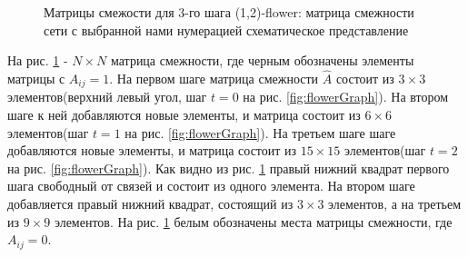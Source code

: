 \documentclass[10pt,aps,pra]{revtex4-1}
\begin{document}
\begin{figure}[H]  

\centering
{}  

\caption{
\label{fig:flowerMatrix}
Матрицы смежости для 3-го шага (1,2)-flower:
  матрица смежности сети с выбранной нами нумерацией
 схематическое представление
}
\end{figure}

На рис. \ref{fig:flowerMatrix} - $N \times N$ матрица смежности, где черным обозначены элементы матрицы с $A_{ij}=1$. На первом шаге матрица смежности $\hat{A}$ состоит из $3 \times 3$ элементов(верхний левый угол, шаг $t=0$ на рис. \ref{fig:flowerGraph}). На втором шаге к ней добавляются новые элементы, и матрица состоит из $6 \times 6$ элементов(шаг $t=1$ на рис. \ref{fig:flowerGraph}). На третьем шаге шаге добавляются новые элементы, и матрица состоит из $15 \times 15$ элементов(шаг $t=2$ на рис. \ref{fig:flowerGraph}). Как видно из рис. \ref{fig:flowerMatrix} правый нижний квадрат первого шага свободный от связей и состоит из одного элемента. На втором шаге добавляется правый нижний квадрат, состоящий из $3 \times 3$ элементов, а на третьем из $9 \times 9$ элементов. На рис. \ref{fig:flowerMatrix} белым обозначены места матрицы смежности, где $A_{ij}=0$.
\end{document}

